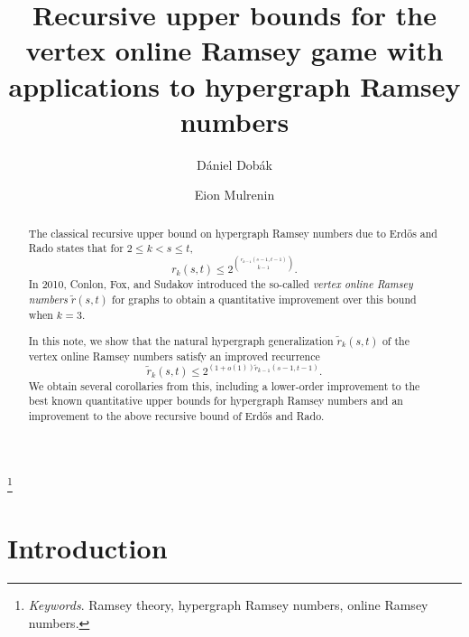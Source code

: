 \documentclass[A4paper,reqno,oneside,12pt]{amsart}
\theoremstyle{plain}
\theoremstyle{definition}
\begin{document}

\title{Recursive upper bounds for the vertex online Ramsey game with applications to hypergraph Ramsey numbers}

\author{D\'aniel Dob\'ak}
\address{Department of Mathematics, Emory University, Atlanta, GA, 30322, USA}

\author{Eion Mulrenin}
\address{Department of Mathematics, Emory University, Atlanta, GA, 30322, USA}

\thanks{{\it Keywords}. Ramsey theory, hypergraph Ramsey numbers, online Ramsey numbers.}


\begin{abstract}
    The classical recursive upper bound on hypergraph Ramsey numbers due to Erd\H{o}s and Rado states that for $2 \leq k < s \leq t$,
    \[
        r_k(s,t) \leq 2^{\binom{r_{k-1}(s-1,t-1)}{k-1}}.
    \]
    In 2010, Conlon, Fox, and Sudakov introduced the so-called {\it vertex online Ramsey numbers} $\tilde{r}(s,t)$ for graphs to obtain a quantitative improvement over this bound when $k=3$.
    
    In this note, we show that the natural hypergraph generalization $\tilde{r}_k(s,t)$ of the vertex online Ramsey numbers satisfy an improved recurrence
    \[
        \tilde{r}_k(s,t) \leq 2^{(1+o(1))\tilde{r}_{k-1}(s-1,t-1)}.
    \]
    We obtain several corollaries from this, including a lower-order improvement to the best known quantitative upper bounds for hypergraph Ramsey numbers and an improvement to the above recursive bound of Erd\H{o}s and Rado.
\end{abstract}

\maketitle


\section{Introduction}
\label{section: intro}
\end{document}
